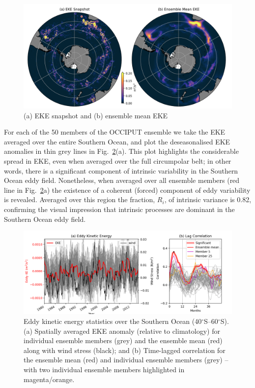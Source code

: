 \documentclass{agujournal2019}
\begin{document}
\begin{figure}[ht]
\begin{center}
\includegraphics[width=\hsize]{Figure1}
\caption{(a) EKE snapshot and (b) ensemble mean EKE  }
\label{Fig:1}
\end{center}
\end{figure}

For each of the 50 members of the OCCIPUT ensemble we take the EKE averaged over the entire Southern Ocean, and plot the deseasonalised EKE anomalies in thin grey lines in Fig.~\ref{Fig:2}(a). 
This plot highlights the considerable spread in EKE, even when averaged over the full circumpolar belt; in other words, there is a significant component of intrinsic variability in the Southern Ocean eddy field.
Nonetheless, when averaged over all ensemble members (red line in Fig.~\ref{Fig:2}a) the existence of a coherent (forced) component of eddy variability is revealed.
Averaged over this region the fraction, $R_i$, of intrinsic variance is 0.82, confirming the visual impression that intrinsic processes are dominant in the Southern Ocean eddy field.

\begin{figure}[t]
\begin{center}
\includegraphics[width=\hsize]{Figure2}
\caption{Eddy kinetic energy statistics over the Southern Ocean (40$^\circ$S--60$^\circ$S). (a) Spatially averaged EKE anomaly (relative to climatology) for individual ensemble members (grey) and the ensemble mean (red) along with wind stress (black); and (b) Time-lagged correlation for the ensemble mean (red) and individual ensemble  members (grey) -- with two individual ensemble members highlighted in magenta/orange.}
\label{Fig:2}
\end{center}
\end{figure}
\end{document}
